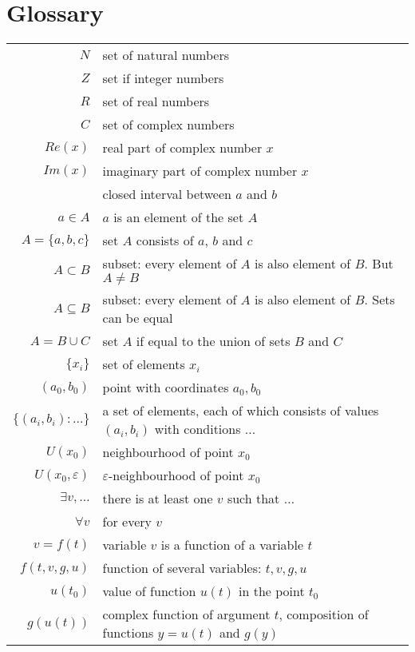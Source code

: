 \documentclass[a4paper, 11pt, oneside]{book}
\begin{document}
\chapter{Glossary}
\pagestyle{fancy}
\fancyhf{}
\lhead{\bfseries\leftmark}
\rhead{\bfseries\rightmark}
\fancyfoot{}
\fancyfoot[R]{\thepage}
\begin{tabular}{r l}
 $N$ & set of natural numbers \\ 
 $Z$ & set if integer numbers \\  
 $R$ & set of real numbers \\
 $C$ & set of complex numbers \\
 $Re(x)$ & real part of complex number $x$ \\
 $Im(x)$ & imaginary part of complex number $x$ \\
 \big[$a$, $b$\big] & closed interval between $a$ and $b$ \\
 $a \in A$ & $a$ is an element of the set $A$ \\
 $A=\{a, b, c\}$ & set $A$ consists of $a$, $b$ and $c$ \\
 $A \subset B$ & subset: every element of $A$ is also element of $B$. But $A \neq B$ \\
 $A \subseteq B$ & subset: every element of $A$ is also element of $B$. Sets can be equal \\
 $A = B \cup C$ & set $A$ if equal to the union of sets $B$ and $C$ \\
 $\{x_i\}$ & set of elements $x_i$ \\
 $(a_0, b_0)$ & point with coordinates $a_0, b_0$ \\
 $\{(a_i, b_i): \ldots \}$ & a set of elements, each of which consists of values $(a_i, b_i)$ with conditions $\ldots$ \\
 $U(x_0)$ & neighbourhood of point $x_0$ \\
 $U(x_0, \varepsilon)$ & $\varepsilon$-neighbourhood of point $x_0$ \\
 $\exists v, \ldots$ & there is at least one $v$ such that $\ldots$ \\
 $\forall v$ & for every $v$ \\
 $v = f(t)$ & variable $v$ is a function of a variable $t$ \\
 $f(t, v, g, u)$ & function of several variables: $t, v, g, u$ \\
 $u(t_0)$ & value of function $u(t)$ in the point $t_0$ \\
 $g(u(t))$ & complex function of argument $t$, composition of functions $y = u(t)$ and $g(y)$ \\

\end{tabular}
\end{document}
